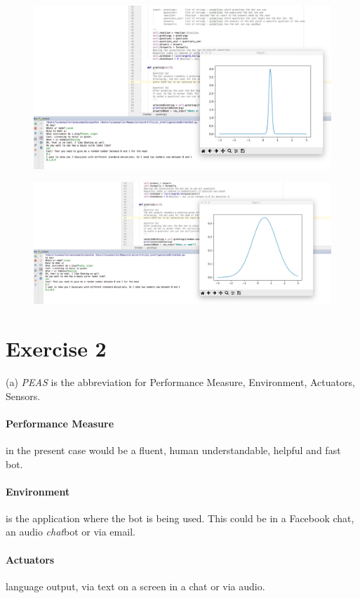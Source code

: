 \documentclass[11pt,a4paper,twoside]{article}
\begin{document}
\begin{figure}[btp]
	\centering
	\includegraphics[width=.8\textwidth]{figures/gauss1.png}
	\label{gauss1}
\end{figure}
\begin{figure}[btp]
	\centering
	\includegraphics[width=.8\textwidth]{figures/gauss2.png}
	\label{gauss2}
\end{figure}

\section*{Exercise 2}
(a) \textit{PEAS} is the abbreviation for Performance Measure, Environment, Actuators, Sensors.
\paragraph{Performance Measure} in the present case would be a fluent, human understandable, helpful and fast bot.
\paragraph{Environment} is the application where the bot is being used. This could be in a Facebook chat, an audio \textit{chat}bot or via email.
\paragraph{Actuators} language output, via text on a screen in a chat or via audio.
\end{document}
